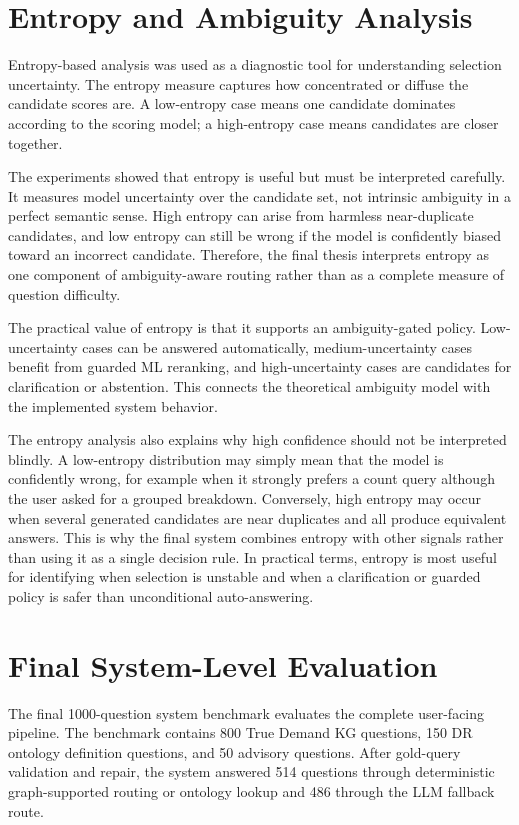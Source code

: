 \documentclass[
  12pt,
  english,
  oneside]{report}
\begin{document}
\section{Entropy and Ambiguity Analysis}
\label{sec:entropy-ambiguity-results}

Entropy-based analysis was used as a diagnostic tool for understanding selection uncertainty. The entropy measure captures how concentrated or diffuse the candidate scores are. A low-entropy case means one candidate dominates according to the scoring model; a high-entropy case means candidates are closer together.

The experiments showed that entropy is useful but must be interpreted carefully. It measures model uncertainty over the candidate set, not intrinsic ambiguity in a perfect semantic sense. High entropy can arise from harmless near-duplicate candidates, and low entropy can still be wrong if the model is confidently biased toward an incorrect candidate. Therefore, the final thesis interprets entropy as one component of ambiguity-aware routing rather than as a complete measure of question difficulty.

The practical value of entropy is that it supports an ambiguity-gated policy. Low-uncertainty cases can be answered automatically, medium-uncertainty cases benefit from guarded ML reranking, and high-uncertainty cases are candidates for clarification or abstention. This connects the theoretical ambiguity model with the implemented system behavior.

The entropy analysis also explains why high confidence should not be interpreted blindly. A low-entropy distribution may simply mean that the model is confidently wrong, for example when it strongly prefers a count query although the user asked for a grouped breakdown. Conversely, high entropy may occur when several generated candidates are near duplicates and all produce equivalent answers. This is why the final system combines entropy with other signals rather than using it as a single decision rule. In practical terms, entropy is most useful for identifying when selection is unstable and when a clarification or guarded policy is safer than unconditional auto-answering.

\section{Final System-Level Evaluation}
\label{sec:final-system-level-evaluation}

The final 1000-question system benchmark evaluates the complete user-facing pipeline. The benchmark contains 800 True Demand KG questions, 150 DR ontology definition questions, and 50 advisory questions. After gold-query validation and repair, the system answered 514 questions through deterministic graph-supported routing or ontology lookup and 486 through the LLM fallback route.
\end{document}

